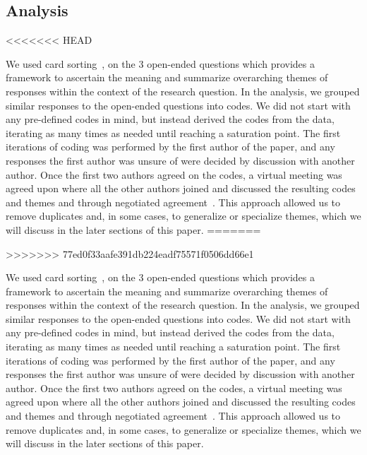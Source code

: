 \subsection{Analysis}
\label{sec:card_sorting}
<<<<<<< HEAD


We used card sorting~\cite{zimmermann2016card}, on the 3 open-ended questions which provides a framework to ascertain the meaning and summarize overarching themes of responses within the context of the research question. In the analysis, we grouped similar responses to the open-ended questions into codes. We did not start with any pre-defined codes in mind, but instead derived the codes from the data, iterating as many times as needed until reaching a saturation point. The first iterations of coding was performed by the first author of the paper, and any responses the first author was unsure of were decided by discussion with another author. Once the first two authors agreed on the codes, a virtual meeting was agreed upon where all the other authors joined and discussed the resulting codes and themes and through negotiated agreement~\cite{Garrison:2006}. This approach allowed us to remove duplicates and, in some cases, to generalize or specialize themes, which we will discuss in the later sections of this paper.
=======

>>>>>>> 77ed0f33aafe391db224eadf75571f0506dd66e1

We used card sorting~\cite{zimmermann2016card}, on the 3 open-ended questions which provides a framework to ascertain the meaning and summarize overarching themes of responses within the context of the research question. In the analysis, we grouped similar responses to the open-ended questions into codes. We did not start with any pre-defined codes in mind, but instead derived the codes from the data, iterating as many times as needed until reaching a saturation point. The first iterations of coding was performed by the first author of the paper, and any responses the first author was unsure of were decided by discussion with another author. Once the first two authors agreed on the codes, a virtual meeting was agreed upon where all the other authors joined and discussed the resulting codes and themes and through negotiated agreement~\cite{Garrison:2006}. This approach allowed us to remove duplicates and, in some cases, to generalize or specialize themes, which we will discuss in the later sections of this paper.